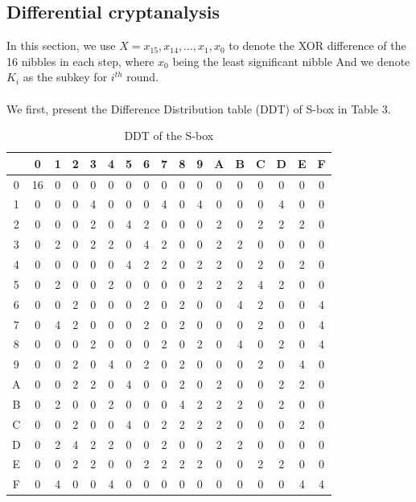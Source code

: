 \documentclass[journal=tosc,preprint]{iacrtrans}
\begin{document}
\subsection{Differential cryptanalysis}
In this section, we use $X = x_{15},x_{14},...,x_{1},x_{0}$ to denote the XOR difference of the 16 nibbles in each step, where $x_0$ being the least significant nibble And we denote $K_i$ as the subkey for $i^{th}$ round. \\\\
We first, present the Difference Distribution table (DDT) of S-box in Table 3.
\begin{table}[h!]
	\caption{DDT of the S-box}
	\centering
	
	\begin{tabular}{ |c||c|c|c|c|c|c|c|c|c|c|c|c|c|c|c|c| }
		\hline
		& 0 & 1 & 2 & 3&4& 5& 6&7&8&9&A&B&C&D&E&F  \\ \hline \hline
		0& 16 & 0 & 0 & 0 &0 &0 &0 &0& 0& 0 &0& 0& 0 &0& 0& 0 \\ 
		1& 0 & 0 & 0 & 4 & 0 & 0 & 0 & 4 & 0 & 4 &0& 0& 0 &4& 0& 0 \\
		2& 0 & 0 & 0 & 2 & 0 & 4 & 2 & 0 & 0 & 0 &2& 0& 2 &2& 2& 0 \\
		3& 0 & 2 & 0 & 2 & 2 & 0 & 4 & 2 & 0 & 0 &2& 2& 0 &0& 0& 0 \\
		4& 0 & 0 & 0 & 0 & 0 & 4 & 2 & 2 & 0 & 2 &2& 0& 2 &0& 2& 0 \\
		5& 0 & 2 & 0 & 0 & 2 & 0 & 0 & 0 & 0 & 2 &2& 2& 4 &2& 0& 0 \\
		6& 0 & 0 & 2 & 0 & 0 & 0 & 2 & 0 & 2 & 0 &0& 4& 2 &0& 0& 4 \\
		7& 0 & 4 & 2 & 0 & 0 & 0 & 2 & 0 & 2 & 0 & 0 & 0 & 2 & 0 & 0 & 4\\
		
		8& 0 & 0 & 0 & 2 & 0 & 0 & 0 & 2 & 0 & 2 & 0 & 4 & 0 & 2 & 0 & 4\\
		9& 0 & 0 & 2 & 0 & 4 & 0 & 2 & 0 & 2 & 0 & 0 & 0 & 2 & 0 & 4 & 0\\
		A& 0 & 0 & 2 & 2 & 0 & 4 & 0 & 0 & 2 & 0 & 2 & 0 & 0 & 2 & 2 & 0\\
		B& 0 & 2 & 0 & 0 & 2 & 0 & 0 & 0 & 4 & 2 & 2 & 2 & 0 & 2 & 0 & 0\\
		C& 0 & 0 & 2 & 0 & 0 & 4 & 0 & 2 & 2 & 2 & 2 & 0 & 0 & 0 & 2 & 0\\
		D& 0 & 2 & 4 & 2 & 2 & 0 & 0 & 2 & 0 & 0 & 2 & 2 & 0 & 0 & 0 & 0\\
		E& 0 & 0 & 2 & 2 & 0 & 0 & 2 & 2 & 2 & 2 & 0 & 0 & 2 & 2 & 0 & 0\\
		F& 0 & 4 & 0 & 0 & 4 & 0 & 0 & 0 & 0 & 0 & 0 & 0 & 0 & 0 & 4 & 4\\ \hline
	\end{tabular}
\end{table}\\
\end{document}
